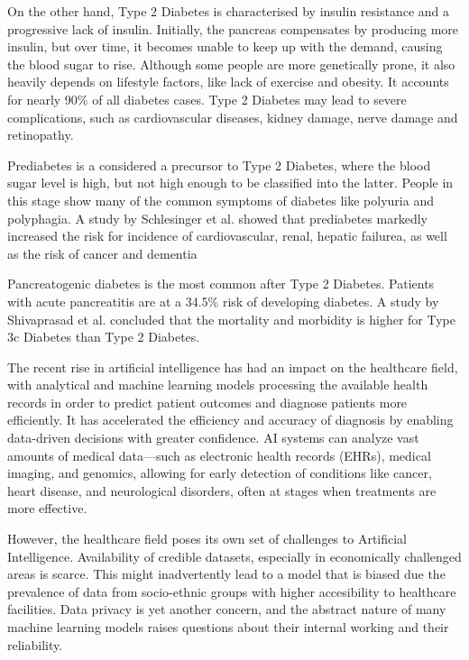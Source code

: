 \documentclass{article}
\begin{document}
\begin{multicols}{2}
On the other hand, Type 2 Diabetes is characterised by insulin resistance and a progressive lack of insulin. Initially, the pancreas compensates by producing more insulin, but over time, it becomes unable to keep up with the demand, causing the blood sugar to rise.
Although some people are more genetically prone, it also heavily depends on lifestyle factors, like lack of exercise and obesity. It accounts for nearly 90\% of all diabetes cases.
Type 2 Diabetes may lead to severe complications, such as cardiovascular diseases, kidney damage, nerve damage and retinopathy.

Prediabetes is a considered a precursor to Type 2 Diabetes, where the blood sugar level is high, but not high enough to be classified into the latter. People in this stage show many of the common symptoms of diabetes like polyuria and polyphagia.
A study by Schlesinger et al. showed that prediabetes markedly increased the risk for incidence of cardiovascular, renal, hepatic failurea, as well as the risk of cancer and dementia\cite{schlesinger2022prediabetes}

Pancreatogenic diabetes is the  most common after Type 2 Diabetes. Patients with acute pancreatitis are at a 34.5\% risk of developing diabetes.\cite{garcia2023post}
A study by Shivaprasad et al. concluded that the mortality and morbidity is higher for Type 3c Diabetes than Type 2 Diabetes\cite{shivaprasad2021comparison}.

The recent rise in artificial intelligence has had an impact on the healthcare field, with analytical and machine learning models processing the available health records in order to predict patient outcomes and diagnose patients more efficiently.
It has accelerated the efficiency and accuracy of diagnosis by enabling  data-driven decisions with greater confidence. AI systems can analyze vast amounts of medical data—such as electronic health records (EHRs), medical imaging, and genomics, allowing for early detection of conditions like cancer, heart disease, and neurological disorders, often at stages when treatments are more effective.

However, the healthcare field poses its own set of challenges to Artificial Intelligence. Availability of credible datasets, especially in economically challenged areas is scarce. This might inadvertently lead to a model that is biased due the prevalence of data from socio-ethnic groups with higher accesibility to healthcare facilities.
Data privacy is yet another concern, and the abstract nature of many machine learning models raises questions about their internal working and their reliability.


\end{multicols}
\end{document}

